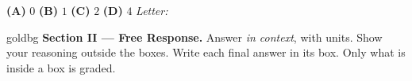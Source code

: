 \documentclass[10pt]{article}
\begin{document}
\begin{enumerate}[leftmargin=1.9em, itemsep=10pt]
      \smallskip
      \textbf{(A)} $0$ \hspace{2.2em} \textbf{(B)} $1$ \hspace{2.2em} \textbf{(C)} $2$ \hspace{2.2em} \textbf{(D)} $4$
      \hfill\textit{Letter:}~\gradedblank[id=ap5, type=choice, points=1, answer=C]{0.42in}{13pt}

\end{enumerate}

\newpage

\begin{headlinebox}{goldbg}
\small
\textbf{Section II --- Free Response.} Answer \emph{in context}, with units. Show your reasoning
outside the boxes. Write each final answer in its box. Only what is inside a box is graded.
\end{headlinebox}

\vspace{0.04in}
\end{document}
